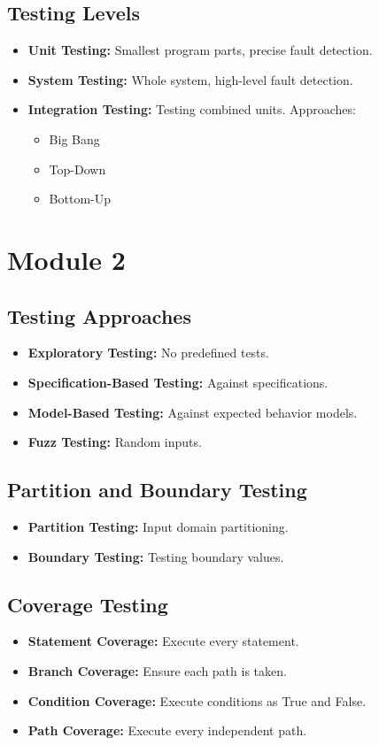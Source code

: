\documentclass[10pt,portrait]{article}
\begin{document}
\begin{multicols}{ 2 }
\subsection*{Testing Levels}
\begin{itemize}
    \item \textbf{Unit Testing:} Smallest program parts, precise fault detection.
    \item \textbf{System Testing:} Whole system, high-level fault detection.
    \item \textbf{Integration Testing:} Testing combined units. Approaches:
    \begin{itemize}
        \item Big Bang
        \item Top-Down
        \item Bottom-Up
    \end{itemize}
\end{itemize}

\section*{Module 2}

\subsection*{Testing Approaches}
\begin{itemize}
    \item \textbf{Exploratory Testing:} No predefined tests.
    \item \textbf{Specification-Based Testing:} Against specifications.
    \item \textbf{Model-Based Testing:} Against expected behavior models.
    \item \textbf{Fuzz Testing:} Random inputs.
\end{itemize}

\subsection*{Partition and Boundary Testing}
\begin{itemize}
    \item \textbf{Partition Testing:} Input domain partitioning.
    \item \textbf{Boundary Testing:} Testing boundary values.
\end{itemize}

\subsection*{Coverage Testing}
\begin{itemize}
    \item \textbf{Statement Coverage:} Execute every statement.
    \item \textbf{Branch Coverage:} Ensure each path is taken.
    \item \textbf{Condition Coverage:} Execute conditions as True and False.
    \item \textbf{Path Coverage:} Execute every independent path.
\end{itemize}


\end{multicols}
\end{document}
